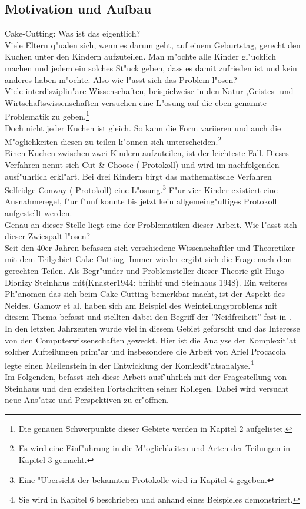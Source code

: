 \documentclass[11pt, a4paper, twoside]{article}
\numberwithin{equation}{section}
\begin{document}
\subsection{Motivation und Aufbau}
Cake-Cutting: Was ist das eigentlich?\\
Viele Eltern q"ualen sich, wenn es darum geht, auf einem Geburtstag, gerecht den Kuchen unter den Kindern aufzuteilen. Man m"ochte alle Kinder gl"ucklich machen und jedem ein solches St"uck geben, dass es damit zufrieden ist und kein anderes haben m"ochte. Also wie l"asst sich das Problem l"osen?\\
Viele interdisziplin"are Wissenschaften, beispielweise in den Natur-,Geistes- und Wirtschaftswissenschaften versuchen eine L"osung auf die eben genannte Problematik zu geben.\footnote{Die genauen Schwerpunkte dieser Gebiete werden in Kapitel 2 aufgelistet.}\\
Doch nicht jeder Kuchen ist gleich. So kann die Form variieren und auch die M"oglichkeiten diesen zu teilen k"onnen sich unterscheiden.\footnote{Es wird eine Einf"uhrung in die M"oglichkeiten und Arten der Teilungen in Kapitel 3 gemacht.}\\
Einen Kuchen zwischen zwei Kindern aufzuteilen, ist der leichteste Fall. Dieses Verfahren nennt sich Cut \& Choose (-Protokoll) und wird im nachfolgenden ausf"uhrlich erkl"art. Bei drei Kindern birgt das mathematische Verfahren Selfridge-Conway (-Protokoll) eine L"osung.\footnote{Eine "Ubersicht der bekannten Protokolle wird in Kapitel 4 gegeben.} F"ur vier Kinder existiert eine Ausnahmeregel, f"ur f"unf konnte bis jetzt kein allgemeing"ultiges Protokoll aufgestellt werden.\\
Genau an dieser Stelle liegt eine der Problematiken dieser Arbeit. Wie l"asst sich dieser Zwiespalt l"osen?\\
Seit den 40er Jahren befassen sich verschiedene Wissenschaftler und Theoretiker mit dem Teilgebiet Cake-Cutting. Immer wieder ergibt sich die Frage nach dem gerechten Teilen. Als Begr"under und Problemsteller dieser Theorie gilt Hugo Dionizy Steinhaus mit\cite{7}(Knaster1944: bfrihbf und Steinhaus 1948). Ein weiteres Ph"anomen das sich beim Cake-Cutting bemerkbar macht, ist der Aspekt des Neides. Gamow et al. haben sich am Beispiel des  Weinteilungsproblems mit diesem Thema befasst und stellten dabei den Begriff der ''Neidfreiheit'' fest in \cite{8}.\\
In den letzten Jahrzenten wurde viel in diesem Gebiet geforscht und das Interesse von den Computerwissenschaften geweckt. Hier ist die Analyse der Komplexit"at solcher Aufteilungen prim"ar und insbesondere die Arbeit von Ariel Procaccia \cite{9} legte einen Meilenstein in der Entwicklung der Komlexit"atsanalyse.\footnote{Sie wird in Kapitel 6 beschrieben und anhand eines Beispieles demonstriert.}\\
Im Folgenden, befasst sich diese Arbeit ausf"uhrlich mit der Fragestellung von Steinhaus und den erzielten Fortschritten seiner Kollegen. Dabei wird versucht neue Ans"atze und Perspektiven zu er"offnen.
\newpage
\end{document}

